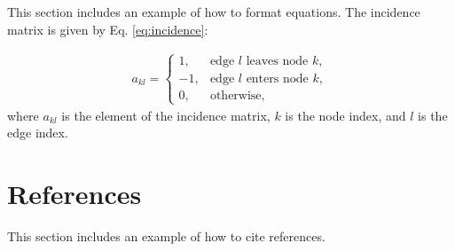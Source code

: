 \documentclass[a4paper]{article}
\begin{document}
This section includes an example of how to format equations. The incidence matrix is given by Eq. \ref{eq:incidence}:

\begin{align}\label{eq:incidence}
    a_{kl}=
    \begin{cases}
        1,  & \text{edge $l$ leaves node $k$},\\
        -1, & \text{edge $l$ enters node $k$},\\
        0,  & \text{otherwise},
    \end{cases}
\end{align}
where $a_{kl}$ is the element of the incidence matrix, $k$ is the node index, and $l$ is the edge index.

\section{References}

This section includes an example of how to cite references\cite{article1}.



\end{document}
